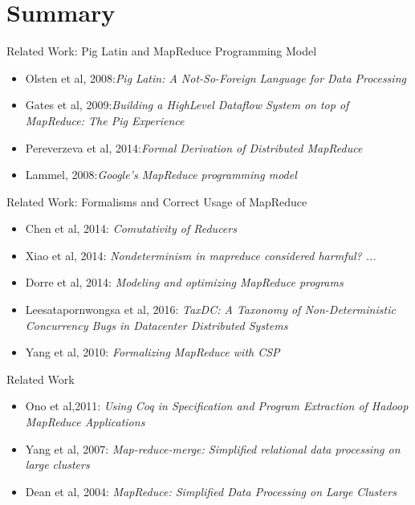 \section*{Summary}

\begin{frame}{Related Work: Pig Latin and MapReduce Programming Model}
  \begin{itemize}
    \item Olsten et al, 2008:\emph{Pig Latin: A Not-So-Foreign Language for Data Processing}
	\item Gates et al, 2009:\emph{Building a HighLevel Dataflow System on top of MapReduce: The Pig Experience}
	\item Pereverzeva et al, 2014:\emph{Formal Derivation of Distributed MapReduce}
	\item Lammel, 2008:\emph{Google's MapReduce programming model}
  \end{itemize}
\end{frame}

\begin{frame}{Related Work: Formalisms and Correct Usage of MapReduce}
  \begin{itemize}
    \item Chen et al, 2014: \emph{Comutativity of Reducers}
    \item Xiao et al, 2014: \emph{Nondeterminism in mapreduce considered harmful? ...}
    \item Dorre et al, 2014: \emph{Modeling and optimizing MapReduce programs}
    \item Leesatapornwongsa et al, 2016: \emph{TaxDC: A Taxonomy of
      Non-Deterministic Concurrency Bugs in Datacenter Distributed Systems}
    \item Yang et al, 2010: \emph{Formalizing MapReduce with CSP}
  \end{itemize}
\end{frame}

\begin{frame}{Related Work}
  \begin{itemize}
    \item Ono et al,2011: \emph{Using Coq in Specification and Program Extraction of Hadoop MapReduce Applications}
    \item Yang et al, 2007: \emph{Map-reduce-merge: Simplified relational data processing on large clusters}
   	\item Dean et al, 2004: \emph{MapReduce: Simplified Data Processing on Large Clusters}
  \end{itemize}
\end{frame}


